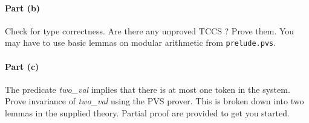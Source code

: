\documentclass[11pt]{article}
\begin{document}
\paragraph{Part (b)} Check for type correctness. Are there any unproved TCCS ? Prove them. You may have to use basic lemmas on modular arithmetic from \texttt{prelude.pvs}.

\paragraph{Part (c)} The predicate {\em two\_val\/} implies that there is at most one token in the system. Prove invariance of {\em two\_val\/} using the PVS prover. This is broken down into two lemmas in the supplied theory. Partial proof are provided to get you started.





%
%
\end{document}
